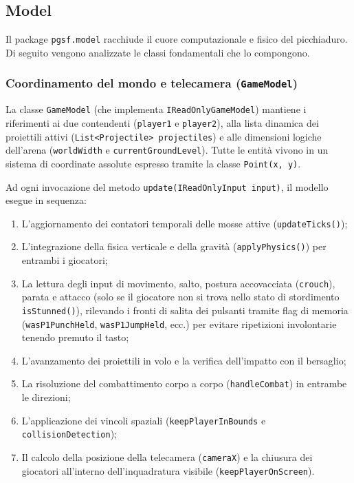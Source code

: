 \documentclass[11pt, a4paper]{article}
\begin{document}
	\subsection{Model}
	Il package \texttt{pgsf.model} racchiude il cuore computazionale e fisico del picchiaduro. Di seguito vengono analizzate le classi fondamentali che lo compongono.
	
	\subsubsection{Coordinamento del mondo e telecamera (\texttt{GameModel})}
	La classe \texttt{GameModel} (che implementa \texttt{IReadOnlyGameModel}) mantiene i riferimenti ai due contendenti (\texttt{player1} e \texttt{player2}), alla lista dinamica dei proiettili attivi (\texttt{List<Projectile> projectiles}) e alle dimensioni logiche dell'arena (\texttt{worldWidth} e \texttt{currentGroundLevel}). Tutte le entità vivono in un sistema di coordinate assolute espresso tramite la classe \texttt{Point(x, y)}.
	
	Ad ogni invocazione del metodo \texttt{update(IReadOnlyInput input)}, il modello esegue in sequenza:
	\begin{enumerate}
		\item L'aggiornamento dei contatori temporali delle mosse attive (\texttt{updateTicks()});
		\item L'integrazione della fisica verticale e della gravità (\texttt{applyPhysics()}) per entrambi i giocatori;
		\item La lettura degli input di movimento, salto, postura accovacciata (\texttt{crouch}), parata e attacco (solo se il giocatore non si trova nello stato di stordimento \texttt{isStunned()}), rilevando i fronti di salita dei pulsanti tramite flag di memoria (\texttt{wasP1PunchHeld}, \texttt{wasP1JumpHeld}, ecc.) per evitare ripetizioni involontarie tenendo premuto il tasto;
		\item L'avanzamento dei proiettili in volo e la verifica dell'impatto con il bersaglio;
		\item La risoluzione del combattimento corpo a corpo (\texttt{handleCombat}) in entrambe le direzioni;
		\item L'applicazione dei vincoli spaziali (\texttt{keepPlayerInBounds} e \texttt{collisionDetection});
		\item Il calcolo della posizione della telecamera (\texttt{cameraX}) e la chiusura dei giocatori all'interno dell'inquadratura visibile (\texttt{keepPlayerOnScreen}).
	\end{enumerate}
	
\end{document}
